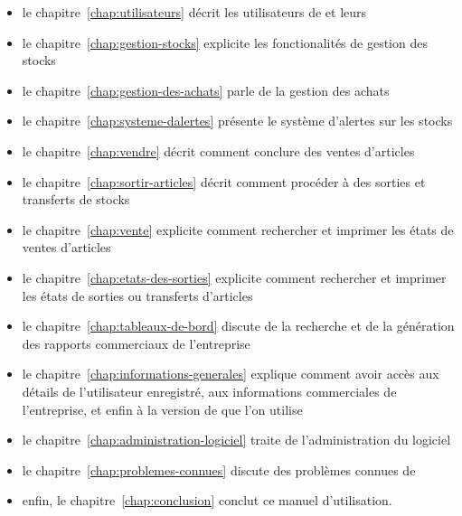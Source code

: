 \begin{itemize}[]
	\item le chapitre~\ref{chap:utilisateurs} d\'ecrit
	les utilisateurs de \yeren et leurs \roles
	     
	\item le chapitre~\ref{chap:gestion-stocks} explicite
	les fonctionalit\'es de gestion des stocks

	\item le chapitre~\ref{chap:gestion-des-achats} parle
	de la gestion des achats
	
	\item le chapitre~\ref{chap:systeme-dalertes}
	pr\'esente le syst\`eme d'alertes sur les stocks
	
	\item le chapitre~\ref{chap:vendre} d\'ecrit comment
	conclure des ventes d'articles
	
	\item le chapitre~\ref{chap:sortir-articles} d\'ecrit
	comment proc\'eder \`a des sorties et transferts de stocks
	
	\item le chapitre~\ref{chap:vente} explicite comment
	rechercher et imprimer les \'etats de ventes d'articles
	
	\item le chapitre~\ref{chap:etats-des-sorties} explicite
	comment rechercher et imprimer les \'etats de sorties ou
	transferts d'articles
	
	\item le chapitre~\ref{chap:tableaux-de-bord} discute
	de la recherche et de la g\'en\'eration des rapports
	commerciaux de l'entreprise
	
	\item le chapitre~\ref{chap:informations-generales}
	explique comment avoir acc\`es aux d\'etails de
	l'utilisateur enregistr\'e, aux informations commerciales
	de l'entreprise, et enfin \`a la version de \yeren que
	l'on utilise
	
	\item le chapitre~\ref{chap:administration-logiciel}
	traite de l'administration du logiciel

	\item le chapitre~\ref{chap:problemes-connues}
	discute des probl\`emes connues de \yeren
	
	\item enfin, le chapitre~\ref{chap:conclusion} conclut
	ce manuel d'utilisation.
\end{itemize}

